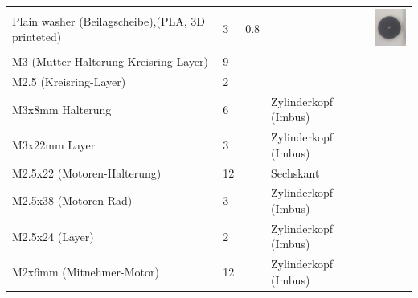 \documentclass[twoside,colorback,accentcolor=tud4c,11pt]{tudreport}
\begin{document}
\begin{tabular}{l l l l l}
	Plain washer (Beilagscheibe),(PLA, 3D printeted)&3&0.8 & &
	\includegraphics[height=0.06\textwidth]{img/beilagscheibe.png}  \\
	
	M3  (Mutter-Halterung-Kreisring-Layer)&9& & & \\
	M2.5  (Kreisring-Layer)&2& & & \\
	M3x8mm Halterung &6& &Zylinderkopf (Imbus) & \\
	M3x22mm Layer&3& &Zylinderkopf (Imbus) & \\
	M2.5x22 (Motoren-Halterung) &12&&Sechskant & \\
	M2.5x38 (Motoren-Rad)&3& &Zylinderkopf (Imbus) & \\
	M2.5x24 (Layer)&2& &Zylinderkopf (Imbus) & \\
	M2x6mm  (Mitnehmer-Motor)&12 & &Zylinderkopf (Imbus) & \\
	
\end{tabular}
\end{document}
